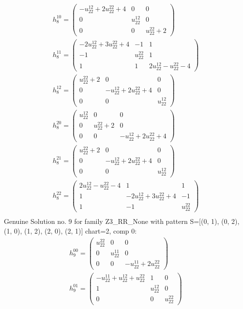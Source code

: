 \documentclass[a4paper, 11pt, twoside, onecolumn]{article}
\begin{document}
\begin{landscape}
\begin{gather*}
	 h_8^{10}=\begin{pmatrix}- u^{12}_{22} + 2 u^{22}_{22} + 4 & 0 & 0\\0 & u^{12}_{22} & 0\\0 & 0 & u^{22}_{22} + 2\end{pmatrix}\\ 
	 h_8^{11}=\begin{pmatrix}- 2 u^{12}_{22} + 3 u^{22}_{22} + 4 & -1 & 1\\-1 & u^{22}_{22} & 1\\1 & 1 & 2 u^{12}_{22} - u^{22}_{22} - 4\end{pmatrix}\\ 
	 h_8^{12}=\begin{pmatrix}u^{22}_{22} + 2 & 0 & 0\\0 & - u^{12}_{22} + 2 u^{22}_{22} + 4 & 0\\0 & 0 & u^{12}_{22}\end{pmatrix}\\ 
	 h_8^{20}=\begin{pmatrix}u^{12}_{22} & 0 & 0\\0 & u^{22}_{22} + 2 & 0\\0 & 0 & - u^{12}_{22} + 2 u^{22}_{22} + 4\end{pmatrix}\\ 
	 h_8^{21}=\begin{pmatrix}u^{22}_{22} + 2 & 0 & 0\\0 & - u^{12}_{22} + 2 u^{22}_{22} + 4 & 0\\0 & 0 & u^{12}_{22}\end{pmatrix}\\ 
	 h_8^{22}=\begin{pmatrix}2 u^{12}_{22} - u^{22}_{22} - 4 & 1 & 1\\1 & - 2 u^{12}_{22} + 3 u^{22}_{22} + 4 & -1\\1 & -1 & u^{22}_{22}\end{pmatrix}\\ 
\end{gather*} 
Genuine Solution no. 9 for family Z3_RR_None with pattern S=[(0, 1), (0, 2), (1, 0), (1, 2), (2, 0), (2, 1)] chart=2, comp 0: 
\begin{gather*} 
	 h_9^{00}=\begin{pmatrix}u^{22}_{22} & 0 & 0\\0 & u^{11}_{22} & 0\\0 & 0 & - u^{11}_{22} + 2 u^{22}_{22}\end{pmatrix}\\ 
	 h_9^{01}=\begin{pmatrix}- u^{11}_{22} + u^{12}_{22} + u^{22}_{22} & 1 & 0\\1 & u^{12}_{22} & 0\\0 & 0 & u^{22}_{22}\end{pmatrix}\\ 

\end{gather*}
\end{landscape}
\end{document}
